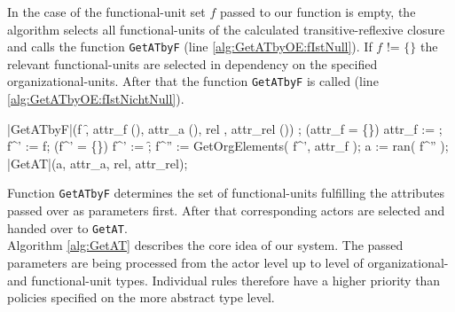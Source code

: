 In the case of the functional-unit set $f$ passed to our function is empty, the algorithm selects all functional-units of the calculated transitive-reflexive closure and calls the function {\tt GetATbyF} (line \ref{alg:GetATbyOE:fIstNull}). If $f$ != $\{\}$ the relevant functional-units are selected in dependency on the specified organizational-units. After that the function {\tt GetATbyF} is called	(line \ref{alg:GetATbyOE:fIstNichtNull}).

	\begin{samepage}
	{\small
	\NumberProgramstrue
	\begin{algorithm}[GetATbyF]\label{alg:GetATbyF}
	\begin{program}
	\FUNCT |GetATbyF|(f \subset \f, attr_f \subset (\Bezeichner \times \WerteMenge), attr_a \subset (\Bezeichner \times \WerteMenge),
	rel \in \relname, attr_{rel} \subset (\Bezeichner \times \WerteMenge)) \subset \a
	\BEGIN
	\var {};
	\IF (attr_f = \{\})
	\THEN attr_f := \attribute;
	\FI
	f^{'} := f;
	\IF (f^{'} = \{\})
	\THEN f^{'} := \f;
	\FI
	f^{''} := GetOrgElements( f^{'}, attr_f );
	a := ran( f^{''} \lhd \relstrukturFA );
	\RETURN \quad |GetAT|(a, attr_a, rel, attr_{rel});
	\END
	\end{program}
	\end{algorithm}
	\NumberProgramsfalse
	}
	\end{samepage}

\noindent Function {\tt GetATbyF} determines the set of functional-units fulfilling the attributes passed over as parameters first. After that corresponding actors are selected and handed over to {\tt GetAT}.\\

Algorithm \ref{alg:GetAT} describes the core idea of our system. The passed parameters are being processed from the actor level up to level of organizational- and functional-unit types. Individual rules therefore have a higher priority than policies specified on the more abstract type level.

